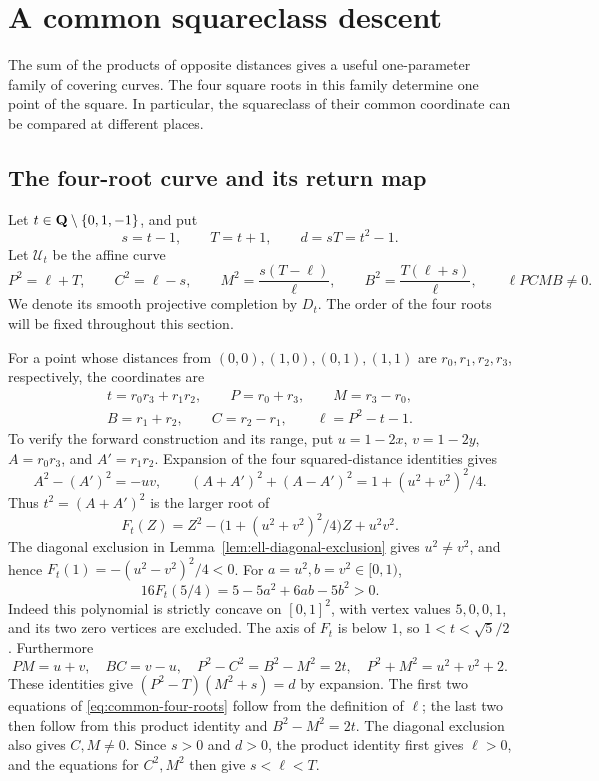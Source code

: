 \section{A common squareclass descent}\label{sec:common-descent}

The sum of the products of opposite distances gives a useful one-parameter
family of covering curves.  The four square roots in this family determine
one point of the square.  In particular, the squareclass of their common
coordinate can be compared at different places.

\subsection{The four-root curve and its return map}

Let $t\in\mathbf Q\setminus\{0,1,-1\}$, and put
\[
 s=t-1,\qquad T=t+1,\qquad d=sT=t^2-1.
\]
Let $\mathcal U_t$ be the affine curve
\begin{equation}\label{eq:common-four-roots}
 P^2=\ell+T,\qquad C^2=\ell-s,\qquad
 M^2=\frac{s(T-\ell)}\ell,\qquad B^2=\frac{T(\ell+s)}\ell,
 \qquad \ell PCMB\ne0.
\end{equation}
We denote its smooth projective completion by $D_t$.  The order of the
four roots will be fixed throughout this section.

For a point whose distances from $(0,0),(1,0),(0,1),(1,1)$ are
$r_0,r_1,r_2,r_3$, respectively, the coordinates are
\begin{equation}\label{eq:common-from-distances}
\begin{gathered}
 t=r_0r_3+r_1r_2,\qquad P=r_0+r_3,\qquad M=r_3-r_0,\\
 B=r_1+r_2,\qquad C=r_2-r_1,\qquad \ell=P^2-t-1.
\end{gathered}
\end{equation}
To verify the forward construction and its range, put $u=1-2x$,
$v=1-2y$, $A=r_0r_3$, and $A'=r_1r_2$.
Expansion of the four squared-distance identities gives
\[
 A^2-(A')^2=-uv,\qquad
 (A+A')^2+(A-A')^2=1+(u^2+v^2)^2/4.
\]
Thus $t^2=(A+A')^2$ is the larger root of
\[
 F_t(Z)=Z^2-\bigl(1+(u^2+v^2)^2/4\bigr)Z+u^2v^2.
\]
The diagonal exclusion in Lemma~\ref{lem:ell-diagonal-exclusion} gives
$u^2\ne v^2$, and hence $F_t(1)=-(u^2-v^2)^2/4<0$.
For $a=u^2,b=v^2\in[0,1)$,
\[
 16F_t(5/4)=5-5a^2+6ab-5b^2>0.
\]
Indeed this polynomial is strictly concave on $[0,1]^2$, with vertex
values $5,0,0,1$, and its two zero vertices are excluded.
The axis of $F_t$ is below $1$, so $1<t<\sqrt5/2$.
Furthermore
\[
 PM=u+v,\quad BC=v-u,\quad
 P^2-C^2=B^2-M^2=2t,\quad P^2+M^2=u^2+v^2+2.
\]
These identities give $(P^2-T)(M^2+s)=d$ by expansion.
The first two equations of \eqref{eq:common-four-roots} follow from the
definition of $\ell$; the last two then follow from this product
identity and $B^2-M^2=2t$.  The diagonal exclusion also gives
$C,M\ne0$.  Since $s>0$ and $d>0$, the product identity first gives
$\ell>0$, and the equations for $C^2,M^2$ then give $s<\ell<T$.


